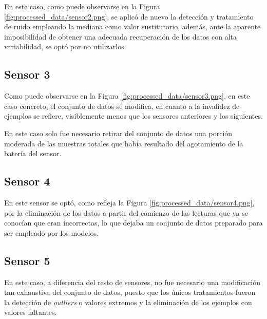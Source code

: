 En este caso, como puede observarse en la Figura \ref{fig:processed_data/sensor2.png},
se aplicó de nuevo la detección y tratamiento de ruido empleando la mediana como 
valor sustitutorio, además, ante la aparente imposibilidad de obtener una adecuada
recuperación de los datos con alta variabilidad, se optó por no utilizarlos.

\newpage

\subsection{Sensor 3}

Como puede observarse en la Figura \ref{fig:processed_data/sensor3.png}, en este caso
concreto, el conjunto de datos se modifica, en cuanto a la invalidez de ejemplos se refiere,
visiblemente menos que los sensores anteriores y los siguientes.

En este caso solo fue necesario retirar del conjunto de datos una porción moderada de las
muestras totales que había resultado del agotamiento de la batería del sensor.

\newpage

\subsection{Sensor 4}

En este sensor se optó, como refleja la Figura \ref{fig:processed_data/sensor4.png}, 
por la eliminación de los datos a partir del comienzo de las lecturas que ya
se conocían que eran incorrectas, lo que dejaba un conjunto de datos preparado
para ser empleado por los modelos. 

\newpage

\subsection{Sensor 5}

En este caso, a diferencia del resto de sensores, no fue necesario una modificación
tan exhaustiva del conjunto de datos, puesto que los únicos tratamientos fueron la 
detección de \textit{outliers} o valores extremos y la eliminación de los ejemplos
con valores faltantes.

\newpage

